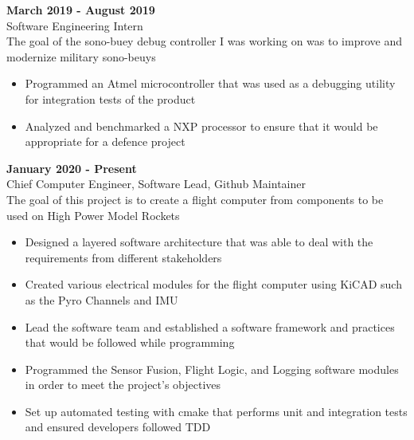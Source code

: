 \documentclass[10pt]{article}
\newcommand{\entrySpacing}{4pt}
\begin{document}
\noindent\begin{minipage}{\linewidth}
 \hfill \textbf{March 2019 - August 2019}\\
Software Engineering Intern\hfill \\The goal of the sono-buey debug controller I was working on was to improve and modernize military sono-beuys
\begin{itemize}[noitemsep,nolistsep]
\item Programmed an Atmel microcontroller that was used as a debugging utility for integration tests of the product
\item Analyzed and benchmarked a NXP processor to ensure that it would be appropriate for a defence project
\end{itemize}


\end{minipage}
\vspace{\entrySpacing}


\noindent\begin{minipage}{\linewidth}
 \hfill \textbf{January 2020 - Present}\\
Chief Computer Engineer, Software Lead, Github Maintainer\hfill \\The goal of this project is to create a flight computer from components to be used on High Power Model Rockets
\begin{itemize}[noitemsep,nolistsep]
\item Designed a layered software architecture that was able to deal with the requirements from different stakeholders
\item Created various electrical modules for the flight computer using KiCAD such as the Pyro Channels and IMU
\item Lead the software team and established a software framework and practices that would be followed while programming
\item Programmed the Sensor Fusion, Flight Logic, and Logging software modules in order to meet the project's objectives
\item Set up automated testing with cmake that performs unit and integration tests and ensured developers followed TDD
\end{itemize}


\end{minipage}
\vspace{\entrySpacing}
\end{document}
